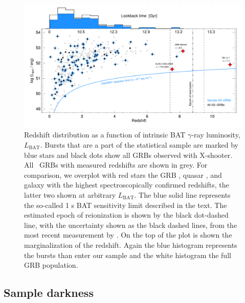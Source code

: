 \documentclass{aa}    %
\begin{document}
\begin{figure}
	\centering \includegraphics[width=16cm]{figures/XSGRB_redshift_swiftdots.pdf}
\caption{Redshift distribution as a function of intrinsic BAT $\gamma$-ray
	luminosity, $L_{\mathrm{BAT}}$. Bursts that are a part of the statistical
	sample are marked by blue stars and black dots show all GRBs observed with
	X-shooter. All \swift~GRBs with measured redshifts are shown in grey. For
	comparison, we overplot with red stars the GRB \citep{Tanvir2009b,
		Salvaterra2009a}, quasar \citep{Banados2017}, and galaxy \citep{Oesch2016} with
	the highest spectroscopically confirmed redshifts, the latter two shown at
	arbitrary $L_{\mathrm{BAT}}$. The blue solid line represents the so-called 1 s
	BAT sensitivity limit described in the text. The estimated epoch of
	reionization is shown by the black dot-dashed line, with the uncertainty shown
	as the black dashed lines, from the most recent measurement by
	\citet{Planck2015}. On the top of the plot is shown the marginalization of the
	redshift. Again the blue histogram represents the bursts than enter our sample
	and the white histogram the full GRB population. } \label{fig:z}
\end{figure}



\subsection{Sample darkness} \label{darkness}
\end{document}
